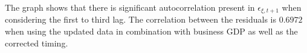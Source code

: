 The graph shows that there is significant autocorrelation present in ${\epsilon}_{\xi,t+1}$ when considering the first to third lag.
The correlation between the residuals is $0.6972$ when using the updated data in combination with business GDP as well as the corrected timing. 


